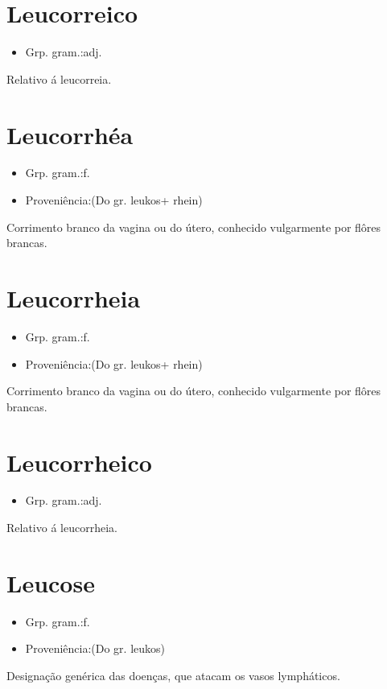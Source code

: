 \section{Leucorreico}
\begin{itemize}
\item {Grp. gram.:adj.}
\end{itemize}
Relativo á leucorreia.
\section{Leucorrhéa}
\begin{itemize}
\item {Grp. gram.:f.}
\end{itemize}
\begin{itemize}
\item {Proveniência:(Do gr. \textunderscore leukos\textunderscore  + \textunderscore rhein\textunderscore )}
\end{itemize}
Corrimento branco da vagina ou do útero, conhecido vulgarmente por flôres brancas.
\section{Leucorrheia}
\begin{itemize}
\item {Grp. gram.:f.}
\end{itemize}
\begin{itemize}
\item {Proveniência:(Do gr. \textunderscore leukos\textunderscore  + \textunderscore rhein\textunderscore )}
\end{itemize}
Corrimento branco da vagina ou do útero, conhecido vulgarmente por flôres brancas.
\section{Leucorrheico}
\begin{itemize}
\item {Grp. gram.:adj.}
\end{itemize}
Relativo á leucorrheia.
\section{Leucose}
\begin{itemize}
\item {Grp. gram.:f.}
\end{itemize}
\begin{itemize}
\item {Proveniência:(Do gr. \textunderscore leukos\textunderscore )}
\end{itemize}
Designação genérica das doenças, que atacam os vasos lympháticos.
